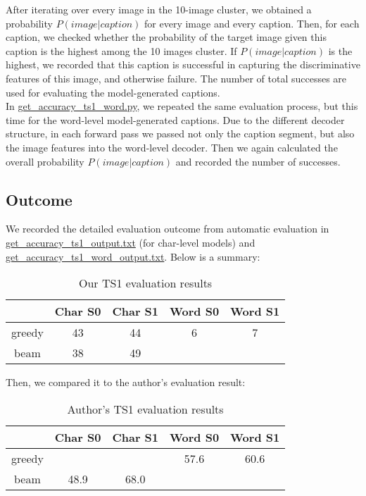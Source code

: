 \documentclass[a4paper]{scrartcl}
\begin{document}
After iterating over every image in the 10-image cluster, we obtained a probability $P(image|caption)$ for every image and every caption. Then, for each caption, we checked whether the probability of the target image given this caption is the highest among the 10 images cluster. If $P(image|caption)$ is the highest, we recorded that this caption is successful in capturing the discriminative features of this image, and otherwise failure. The number of total successes are used for evaluating the model-generated captions.\\

In \href{https://github.com/Meng3www/PPlusPlus/blob/main/evaluate/get\_accuracy\_ts1\_word.py}{get\_accuracy\_ts1\_word.py}, we repeated the same evaluation process, but this time for the word-level model-generated captions. Due to the different decoder structure, in each forward pass we passed not only the caption segment, but also the image features into the word-level decoder. Then we again calculated the overall probability $P(image|caption)$ and recorded the number of successes.\\

\subsection*{Outcome}
We recorded the detailed evaluation outcome from automatic evaluation in \href{https://github.com/Meng3www/PPlusPlus/blob/main/evaluate/get\_accuracy\_ts1\_output.txt}{get\_accuracy\_ts1\_output.txt} (for char-level models) and \href{https://github.com/Meng3www/PPlusPlus/blob/main/evaluate/get\_accuracy\_ts1\_word\_output.txt}{get\_accuracy\_ts1\_word\_output.txt}. Below is a summary:
\begin{table}[H]
\begin{center}
\begin{tabular}{ c c c c c }
   & Char S0 & Char S1 & Word S0 & Word S1 \\ 
   \hline
 greedy & 43 & 44 & 6 & 7\\  
 beam & 38 & 49 & &  
\end{tabular}
\end{center}
\caption{\label{Table 1}Our TS1 evaluation results}
\end{table}

Then, we compared it to the author's evaluation result:
\begin{table}[H]
\begin{center}
\begin{tabular}{ c c c c c }
   & Char S0 & Char S1 & Word S0 & Word S1 \\ 
   \hline
 greedy & & & 57.6 & 60.6\\  
 beam & 48.9 & 68.0 & &  
\end{tabular}
\end{center}
\caption{\label{Table 2}Author's TS1 evaluation results}
\end{table}
\end{document}
